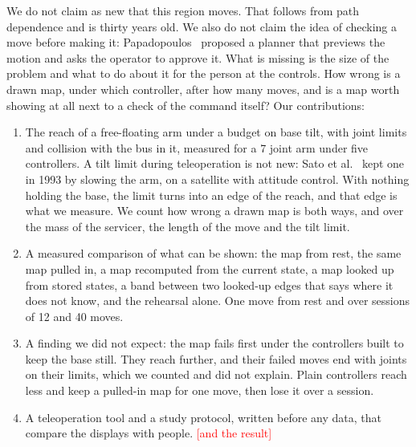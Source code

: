 \documentclass[pdflatex,sn-mathphys-num]{sn-jnl}
\newcommand{\todo}[1]{\textcolor{red}{[#1]}}
\begin{document}
We do not claim as new that this region moves. That follows from path dependence and is thirty years old. We also do not
claim the idea of checking a move before making it: Papadopoulos~\cite{papadopoulos1992} proposed a planner that
previews the motion and asks the operator to approve it. What is missing is the size of the problem and what to do
about it for the person at the controls. How wrong is a drawn map, under which controller, after how many moves,
and is a map worth showing at all next to a check of the command itself? Our contributions:
\begin{enumerate}
\item The reach of a free-floating arm under a budget on base tilt, with joint limits and collision with the bus
in it, measured for a 7 joint arm under five controllers. A tilt limit during teleoperation is not new:
Sato et al.~\cite{sato1993} kept one in 1993 by slowing the arm, on a satellite with attitude control. With
nothing holding the base, the limit turns into an edge of the reach, and that edge is what we measure. We count
how wrong a drawn map is both ways, and over the mass of the servicer, the length of the move and the tilt limit.
\item A measured comparison of what can be shown: the map from rest, the same map pulled in, a map recomputed from
the current state, a map looked up from stored states, a band between two looked-up edges that says where it
does not know, and the rehearsal alone. One move from rest and over
sessions of 12 and 40 moves.
\item A finding we did not expect: the map fails first under the controllers built to keep the base still. They
reach further, and their failed moves end with joints on their limits, which we counted and did not explain.
Plain controllers reach less and keep a pulled-in
map for one move, then lose it over a session.
\item A teleoperation tool and a study protocol, written before any data, that compare the displays with people.
\todo{and the result}
\end{enumerate}
\end{document}
